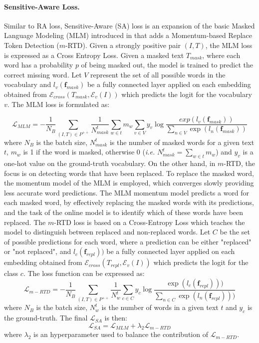 \documentclass[acmsmall]{acmart}
\begin{document}
\paragraph{Sensitive-Aware Loss.} 
Similar to RA loss, Sensitive-Aware (SA) loss is an expansion of the basic Masked Language Modeling (MLM) introduced in \cite{jiang2023cross} that adds a Momentum-based Replace Token Detection ($m$-RTD). Given a strongly positive pair \((I, T)\), the MLM loss is expressed as a Cross Entropy Loss. Given a masked text $T_{mask}$, where each word has a probability \( p \) of being masked out, the model is trained to predict the correct missing word. Let \( V \) represent the set of all possible words in the vocabulary and $l_v(\mathbf{f}_{mask})$ be a fully connected layer applied on each embedding obtained from $\mathcal{E}_{cross}(T_{mask},\mathcal{E}_v(I))$ which  predicts the logit for the vocabulary $v$. The MLM loss is formulated as:

\begin{equation}
    \mathcal{L}_{MLM}=-\frac{1}{N_B}\sum_{(I,T)\in P^{++}}\frac{1}{N_{mask}^t}\sum_{w\in t}m_w\sum_{v\in V}y_v\log\frac{exp(l_v(\mathbf{f}_{mask}))}{\sum_{n\in V}\exp(l_n(\mathbf{f}_{mask}))}
\end{equation}
where $N_B$ is the batch size, $N_{mask}^t$ is the number of masked words for a given text $t$, $m_w$ is 1 if the word is masked, otherwise 0 (\textit{i.e.} $N_{mask}^t=\sum_{w\in t}m_w$) and $y_v$ is a one-hot value on the ground-truth vocabulary. On the other hand, in $m$-RTD, the focus is on detecting words that have been replaced. To replace the masked word, the momentum model of the MLM is employed, which converges slowly providing less accurate word predictions. The MLM momentum model predicts a word for each masked word, by effectively replacing the masked words with its predictions, and the task of the online model is to identify which of these words have been replaced. The $m$-RTD loss is based on a Cross-Entropy Loss which teaches the model to distinguish between replaced and non-replaced words. Let $C$ be the set of possible predictions for each word, where a prediction can be either "replaced" or "not replaced", and $l_c(\mathbf{f}_{repl}))$ be a fully connected layer applied on each embedding obtained from $\mathcal{E}_{cross}(T_{repl},\mathcal{E}_v(I))$ which predicts the logit for the class $c$. The loss function can be expressed as:
\begin{equation}
    \mathcal{L}_{m-RTD}=-\frac{1}{N_B}\sum_{(I,T) \in P^{++}}\frac{1}{N_w^t}\sum_{c\in C}y_c\log \frac{\exp(l_c(\mathbf{f}_{repl})))}{\sum_{n\in C}\exp(l_n(\mathbf{f}_{repl})))}
\end{equation}
where $N_B$ is the batch size, $N_w^t$ is the number of words in a given text $t$ and $y_c$ is the ground-truth. The final $\mathcal{L}_{SA}$ is then:
\begin{equation}
    \mathcal{L}_{SA}=\mathcal{L}_{MLM}+\lambda_2\mathcal{L}_{m-RTD}
\end{equation}
\noindent where $\lambda_2$ is an hyperparameter used to balance the contribution of $\mathcal{L}_{m-RTD}$.
\end{document}

